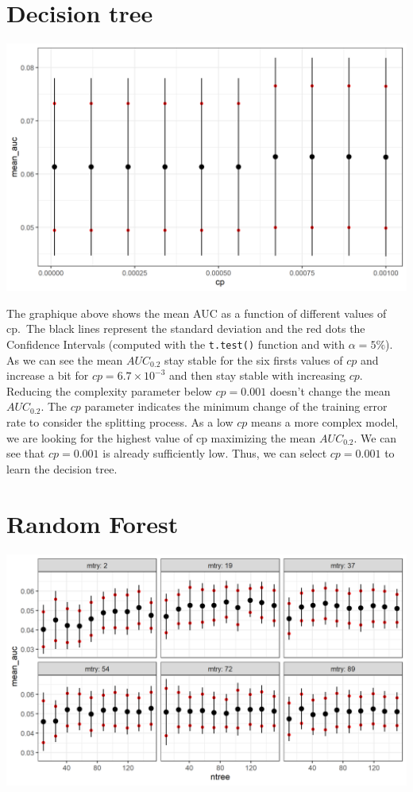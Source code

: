 \documentclass[
  12pt,
  oneside]{report}
\begin{document}
\hypertarget{decision-tree}{%
\section{Decision tree}\label{decision-tree}}

\includegraphics[width=30.15in]{data/cv_dt}

The graphique above shows the mean AUC as a function of different values of cp.~The black lines represent the standard deviation and the red dots the Confidence Intervals (computed with the \texttt{t.test()} function and with \(\alpha = 5\%\)).
As we can see the mean \(AUC_{0.2}\) stay stable for the six firsts values of \(cp\) and increase a bit for \(cp = 6.7\times10^{-3}\) and then stay stable with increasing \(cp\). Reducing the complexity parameter below \(cp = 0.001\) doesn't change the mean \(AUC_{0.2}\). The \(cp\) parameter indicates the minimum change of the training error rate to consider the splitting process. As a low \(cp\) means a more complex model, we are looking for the highest value of cp maximizing the mean \(AUC_{0.2}\). We can see that \(cp = 0.001\) is already sufficiently low. Thus, we can select \(cp = 0.001\) to learn the decision tree.

\hypertarget{random-forest}{%
\section{Random Forest}\label{random-forest}}

\includegraphics[width=30.03in]{data/cv_rf}
\end{document}
